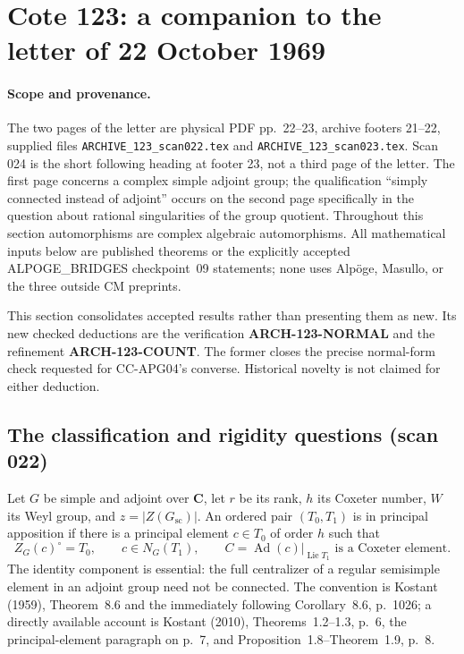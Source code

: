 \section{Cote 123: a companion to the letter of 22 October 1969}
\label{sec:arch123}

\paragraph{Scope and provenance.}
The two pages of the letter are physical PDF pp.~22--23, archive
footers 21--22, supplied files \texttt{ARCHIVE\_123\_scan022.tex} and
\texttt{ARCHIVE\_123\_scan023.tex}.  Scan 024 is the short following
heading at footer 23, not a third page of the letter.  The first page
concerns a complex simple adjoint group; the qualification ``simply
connected instead of adjoint'' occurs on the second page specifically
in the question about rational singularities of the group quotient.
Throughout this section automorphisms are complex algebraic
automorphisms.  All mathematical inputs below are published theorems
or the explicitly accepted ALPOGE\_BRIDGES checkpoint~09 statements;
none uses Alp\"oge, Masullo, or the three outside CM preprints.

This section consolidates accepted results rather than presenting them
as new.  Its new checked deductions are the verification
\textbf{ARCH-123-NORMAL} and the refinement
\textbf{ARCH-123-COUNT}.  The former closes the precise normal-form
check requested for CC-APG04's converse.  Historical novelty is not
claimed for either deduction.

\subsection{The classification and rigidity questions (scan 022)}
Let $G$ be simple and adjoint over $\mathbf C$, let $r$ be its rank,
$h$ its Coxeter number, $W$ its Weyl group, and
$z=|Z(G_{\mathrm{sc}})|$.  An ordered pair $(T_0,T_1)$ is in
principal apposition if there is a principal element $c\in T_0$ of
order $h$ such that
\[
 Z_G(c)^\circ=T_0,\qquad c\in N_G(T_1),\qquad
 C=\operatorname{Ad}(c)|_{\operatorname{Lie}T_1}
 \text{ is a Coxeter element}.
\]
The identity component is essential: the full centralizer of a
regular semisimple element in an adjoint group need not be connected.
The convention is Kostant (1959), Theorem~8.6 and the immediately
following Corollary~8.6, p.~1026; a directly available account is
Kostant (2010), Theorems~1.2--1.3, p.~6, the principal-element paragraph
on p.~7, and Proposition~1.8--Theorem~1.9, p.~8.


